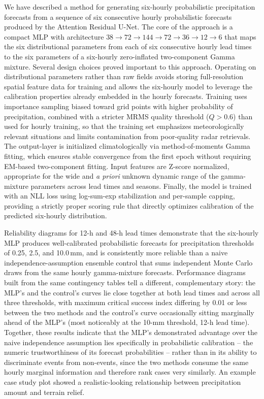 \documentclass[11pt]{article}
\begin{document}
We have described a method for generating six-hourly probabilistic precipitation
forecasts from a sequence of six consecutive hourly probabilistic forecasts
produced by the Attention Residual U-Net.  The core of the approach is a
compact MLP with architecture $38 \to 72 \to 144 \to 72 \to 36 \to 12 \to 6$
that maps the six distributional parameters from each of six consecutive
hourly lead times to the six parameters of a six-hourly zero-inflated
two-component Gamma mixture.  Several design choices proved important to
this approach.  Operating on distributional parameters rather than raw
fields avoids storing full-resolution spatial feature data for training and
allows the six-hourly model to leverage the calibration properties already
embedded in the hourly forecasts.  Training uses importance sampling biased
toward grid points with higher probability of precipitation, combined with
a stricter MRMS quality threshold ($Q > 0.6$) than used for hourly training,
so that the training set emphasizes meteorologically relevant situations
and limits contamination from poor-quality radar retrievals.  The
output-layer is initialized climatologically via method-of-moments Gamma
fitting, which ensures stable convergence from the first epoch without
requiring EM-based two-component fitting.  Input features are Z-score
normalized, appropriate for the wide and \textit{a priori} unknown dynamic
range of the gamma-mixture parameters across lead times and seasons.
Finally, the model is trained with an NLL loss using log-sum-exp
stabilization and per-sample capping, providing a strictly proper scoring
rule that directly optimizes calibration of the predicted six-hourly
distribution.

Reliability diagrams for 12-h and 48-h lead times demonstrate that the
six-hourly MLP produces well-calibrated probabilistic forecasts for
precipitation thresholds of 0.25, 2.5, and 10.0\,mm, and is consistently
more reliable than a naive independence-assumption ensemble control that
sums independent Monte Carlo draws from the same hourly gamma-mixture
forecasts.  Performance diagrams built from the same contingency tables tell
a different, complementary story: the MLP's and the control's curves lie
close together at both lead times and across all three thresholds, with
maximum critical success index differing by 0.01 or less between the two
methods and the control's curve occasionally sitting marginally ahead of the
MLP's (most noticeably at the 10-mm threshold, 12-h lead time).  Together,
these results indicate that the MLP's demonstrated advantage over the naive
independence assumption lies specifically in probabilistic calibration --
the numeric trustworthiness of its forecast probabilities -- rather than in
its ability to discriminate events from non-events, since the two methods
consume the same hourly marginal information and therefore rank cases very
similarly.  An example case study plot showed a realistic-looking
relationship between precipitation amount and terrain relief.
\end{document}

